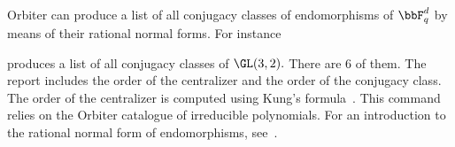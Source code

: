 \bigskip

Orbiter can produce a list of all conjugacy classes 
of endomorphisms of $\bbF_q^d$ by means of their rational normal forms. 
For instance


produces a list of all conjugacy classes of $\GL(3,2).$
There are 6 of them.
The report includes the order of 
the centralizer and the order of the conjugacy class. 
The order of the centralizer is computed 
using Kung's formula~\cite{Kung81}.
This command relies on the Orbiter catalogue of irreducible polynomials.
For an introduction to the rational normal 
form of endomorphisms, see~\cite{Lueneburg1987}.
